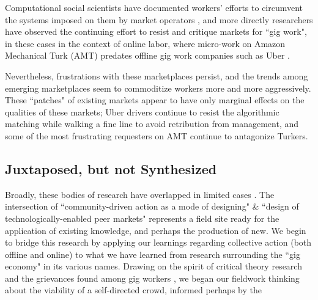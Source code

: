 Computational social scientists have documented workers' efforts to circumvent the systems imposed on them by market operators
\cite{uberAlgorithm},
and more directly researchers have observed the continuing effort to resist and critique markets for ``gig work", in these cases in the context of online labor, where micro-work on Amazon Mechanical Turk (AMT) predates offline gig work companies such as Uber
\cite{turkopticon,dynamo}.

Nevertheless, frustrations with these marketplaces persist,
and the trends among emerging marketplaces seem to commoditize workers more and more aggressively.
These ``patches" of existing markets appear to have only marginal effects on the qualities of these markets;
Uber drivers continue to resist the algorithmic matching while walking a fine line to avoid retribution from management, and some of the most frustrating requesters on AMT continue to antagonize Turkers.

\subsection{Juxtaposed, but not Synthesized}
Broadly, these bodies of research have overlapped in limited cases
\cite{dynamo,turkopticon}.
The intersection of ``community-driven action as a mode of designing" \& ``design of technologically-enabled peer markets" represents a field site ready for the application of existing knowledge, and perhaps the production of new.
We begin to bridge this research by applying our learnings regarding collective action (both offline and online) to what we have learned from research surrounding the ``gig economy" in its various names.
Drawing on the spirit of critical theory research and the grievances found among gig workers \cite{turkopticon,uberAlgorithm}, we began our fieldwork thinking about the viability of a self-directed crowd, informed perhaps by the 